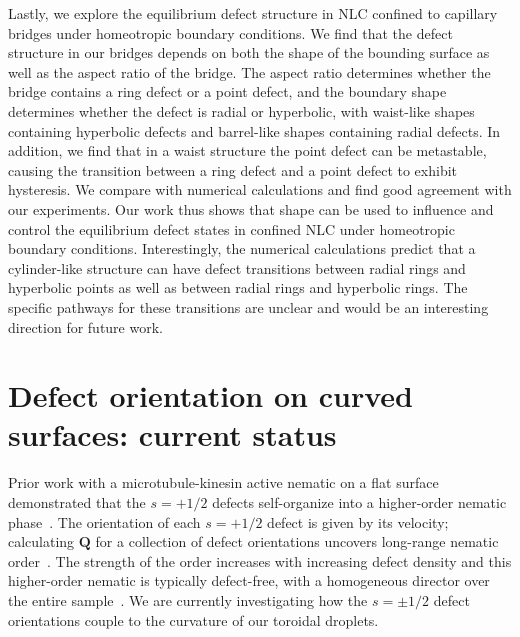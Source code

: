 Lastly, we explore the equilibrium defect structure in NLC confined to capillary bridges under homeotropic boundary conditions.
We find that the defect structure in our bridges depends on both the shape of the bounding surface as well as the aspect ratio of the bridge.
The aspect ratio determines whether the bridge contains a ring defect or a point defect, and the boundary shape determines whether the defect is radial or hyperbolic, with waist-like shapes containing hyperbolic defects and barrel-like shapes containing radial defects.
In addition, we find that in a waist structure the point defect can be metastable, causing the transition between a ring defect and a point defect to exhibit hysteresis.
We compare with numerical calculations and find good agreement with our experiments.
Our work thus shows that shape can be used to influence and control the equilibrium defect states in confined NLC under homeotropic boundary conditions.
Interestingly, the numerical calculations predict that a cylinder-like structure can have defect transitions between radial rings and hyperbolic points as well as between radial rings and hyperbolic rings.
The specific pathways for these transitions are unclear and would be an interesting direction for future work.

\section{Defect orientation on curved surfaces: current status}
Prior work with a microtubule-kinesin active nematic on a flat surface demonstrated that the $s = +1/2$ defects self-organize into a higher-order nematic phase~\cite{RN27}.
The orientation of each $s = +1/2$ defect is given by its velocity; calculating $\mathbf{Q}$ for a collection of defect orientations uncovers long-range nematic order~\cite{RN27}.
The strength of the order increases with increasing defect density and this higher-order nematic is typically defect-free, with a homogeneous director over the entire sample~\cite{RN27}.
We are currently investigating how the $s = \pm 1/2$ defect orientations couple to the curvature of our toroidal droplets.


